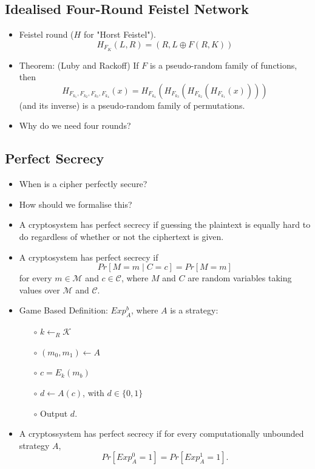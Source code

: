 \documentclass[a4paper]{scrartcl}
\begin{document}
\subsection*{Idealised Four-Round Feistel Network}

\begin{itemize}
\item Feistel round ($H$ for "Horst Feistel").
$$H_{F_K}(L,R) = (R, L \oplus F(R,K))$$
\item Theorem: (Luby and Rackoff) If $F$ is a pseudo-random family of functions, then
$$H_{F_{k_1},F_{k_2},F_{k_3},F_{k_4}}(x) = H_{F_{k_4}}(H_{F_{k_3}}(H_{F_{k_2}}(H_{F_{k_1}}(x))))$$ (and its inverse) is a pseudo-random family of permutations.
\item Why do we need four rounds?
\end{itemize}

\subsection*{Perfect Secrecy}
\begin{itemize}
\item When is a cipher perfectly secure?
\item How should we formalise this?
\item A cryptosystem has perfect secrecy if guessing the plaintext is equally hard to do regardless of whether or not the ciphertext is given.
\item A cryptosystem has perfect secrecy if $$Pr[M = m \mid C = c] = Pr[M = m]$$ for every $m \in {\mathcal M}$ and $c \in {\mathcal C}$, where $M$ and $C$ are random variables taking values over ${\mathcal M}$ and ${\mathcal C}$.
\item Game Based Definition: $Exp_A^b$, where $A$ is a strategy:
\begin{itemize}
\item [$\circ$] $k \leftarrow_R {\mathcal K}$
\item [$\circ$] $(m_0, m_1) \leftarrow A$
\item [$\circ$] $c = E_k(m_b)$
\item [$\circ$] $d\leftarrow A(c)$, with $d \in \{0,1\}$
\item [$\circ$] Output $d$.
\end{itemize}
\item A cryptossystem has perfect secrecy if for every computationally unbounded strategy $A$, $$Pr[Exp_A^0 = 1] = Pr[Exp^1_A = 1].$$
\end{itemize}
\end{document}
